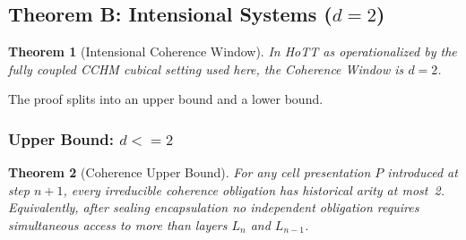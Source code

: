 \documentclass[11pt,a4paper]{article}
\def\leq{<=}%
\theoremstyle{plain}
\newtheorem{theorem}{Theorem}[section]
\theoremstyle{definition}
\theoremstyle{remark}
\begin{document}
\subsection{\texorpdfstring{Theorem B: Intensional Systems ($d = 2$)}{Theorem B: Intensional Systems (d = 2)}}

\begin{theorem}[Intensional Coherence Window]
\label{thm:int-window}
In HoTT as operationalized by the fully coupled CCHM cubical setting used here, the Coherence Window is $d = 2$.
\end{theorem}

The proof splits into an upper bound and a lower bound.

\subsubsection{\texorpdfstring{Upper Bound: $d \leq 2$}{Upper Bound: d <= 2}}

\begin{theorem}[Coherence Upper Bound]
\label{thm:upper}
For any cell presentation $P$ introduced at step $n+1$, every irreducible coherence obligation has historical arity at most~2.
Equivalently, after sealing encapsulation no independent obligation requires simultaneous access to more than layers $L_n$ and $L_{n-1}$.
\end{theorem}
\end{document}
